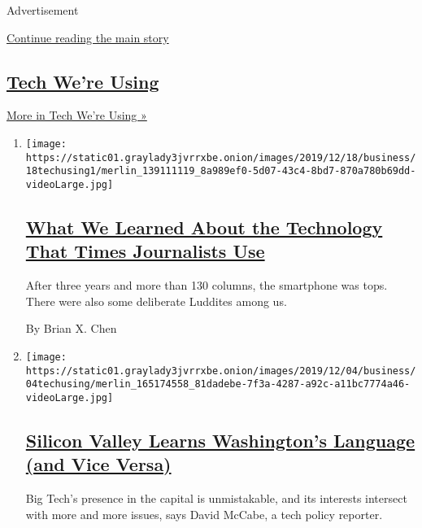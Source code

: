 Advertisement

\protect\hyperlink{after-mid1}{Continue reading the main story}

\hypertarget{tech-were-using}{%
\subsection{\texorpdfstring{\href{/column/tech-we-are-using}{Tech We're
Using}}{Tech We're Using}}\label{tech-were-using}}

\href{/column/tech-we-are-using}{More in Tech We're Using »}

\begin{enumerate}
\def\labelenumi{\arabic{enumi}.}
\item
  \texttt{[image: https://static01.graylady3jvrrxbe.onion/images/2019/12/18/business/18techusing1/merlin\_139111119\_8a989ef0-5d07-43c4-8bd7-870a780b69dd-videoLarge.jpg]}

  \hypertarget{what-we-learned-about-the-technology-that-times-journalists-use}{%
  \subsection{\texorpdfstring{\href{/2019/12/18/technology/personaltech/technology-times-journalists-use.html}{What
  We Learned About the Technology That Times Journalists
  Use}}{What We Learned About the Technology That Times Journalists Use}}\label{what-we-learned-about-the-technology-that-times-journalists-use}}

  After three years and more than 130 columns, the smartphone was tops.
  There were also some deliberate Luddites among us.

  By Brian X. Chen
\item
  \texttt{[image: https://static01.graylady3jvrrxbe.onion/images/2019/12/04/business/04techusing/merlin\_165174558\_81dadebe-7f3a-4287-a92c-a11bc7774a46-videoLarge.jpg]}

  \hypertarget{silicon-valley-learns-washingtons-language-and-vice-versa}{%
  \subsection{\texorpdfstring{\href{/2019/12/04/technology/personaltech/silicon-valley-washington.html}{Silicon
  Valley Learns Washington's Language (and Vice
  Versa)}}{Silicon Valley Learns Washington's Language (and Vice Versa)}}\label{silicon-valley-learns-washingtons-language-and-vice-versa}}

  Big Tech's presence in the capital is unmistakable, and its interests
  intersect with more and more issues, says David McCabe, a tech policy
  reporter.


\end{enumerate}
